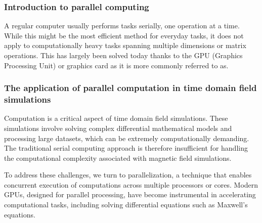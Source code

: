 \subsubsection{Introduction to parallel computing}
A regular computer usually performs tasks serially, one operation at a time. While this might be the most efficient method for everyday tasks, it does not apply to computationally heavy tasks spanning multiple dimensions or matrix operations. This has largely been solved today thanks to the GPU (Graphics Processing Unit) or graphics card as it is more commonly referred to as.
\subsubsection{The application of parallel computation in time domain field simulations}
Computation is a critical aspect of time domain field simulations. These simulations involve solving complex differential mathematical models and processing large datasets, which can be extremely computationally demanding. The traditional serial computing approach is therefore insufficient for handling the computational complexity associated with magnetic field simulations.

To address these challenges, we turn to parallelization, a technique that enables concurrent execution of computations across multiple processors or cores. Modern GPUs, designed for parallel processing, have become instrumental in accelerating computational tasks, including solving differential equations such as Maxwell's equations.




\fi